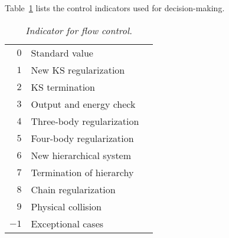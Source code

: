 \documentclass[12pt]{article}
\begin{document}
\bigskip
Table~\ref{control} lists the control indicators used for decision-making.

\begin{table}[b]
\vspace{-8cm}
\centering
\caption{{\it Indicator for flow control.}}
\label{control}
\begin{tabular}{rll}
\hline\hline
$0$ &Standard value \\
$1$ &New KS regularization \\
$2$ &KS termination \\
$3$ &Output and energy check \\
$4$ &Three-body regularization \\
$5$ &Four-body regularization \\
$6$ &New hierarchical system \\
$7$ &Termination of hierarchy \\
$8$ &Chain regularization \\
$9$ &Physical collision \\
$-1$ &Exceptional cases \\
\hline\hline
\end{tabular}
\end{table}
\end{document}
